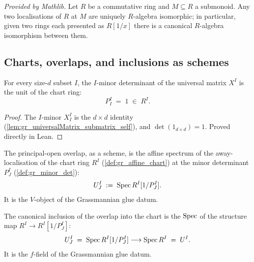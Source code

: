 \begin{lemma}
  \label{lem:mathlib_isLocalization_algEquiv}
  \mathlibok
  \textit{Provided by Mathlib.}
  Let \(R\) be a commutative ring and \(M \subseteq R\) a submonoid. Any two
  localisations of \(R\) at \(M\) are uniquely \(R\)-algebra isomorphic; in
  particular, given two rings each presented as \(R[1/x]\) there is a canonical
  \(R\)-algebra isomorphism between them.
\end{lemma}

\subsection*{Charts, overlaps, and inclusions as schemes}

\begin{theorem}\leanok
  \label{lem:gr_minorDet_self}
  For every size-\(d\) subset \(I\), the \(I\)-minor determinant of the universal
  matrix \(X^I\) is the unit of the chart ring:
  \[
    P^I_I \;=\; 1 \;\in\; R^I.
  \]
\end{theorem}
\begin{proof}
  \leanok
  The \(I\)-minor \(X^I_I\) is the \(d \times d\) identity
  (\cref{lem:gr_universalMatrix_submatrix_self}), and \(\det(1_{d\times d}) = 1\).
  Proved directly in Lean.
\end{proof}

\begin{definition}\leanok
  \label{def:gr_chart_overlap}
  The principal-open overlap, as a scheme, is the affine spectrum of the
  away-localisation of the chart ring \(R^I\) (\cref{def:gr_affine_chart}) at the
  minor determinant \(P^I_J\) (\cref{def:gr_minor_det}):
  \[
    U^I_J \;:=\; \operatorname{Spec} R^I[1/P^I_J].
  \]
  It is the \(V\)-object of the Grassmannian glue datum.
\end{definition}

\begin{definition}\leanok
  \label{def:gr_chart_incl}
  The canonical inclusion of the overlap into the chart is the \(\operatorname{Spec}\) of the
  structure map \(R^I \to R^I[1/P^I_J]\):
  \[
    U^I_J \;=\; \operatorname{Spec} R^I[1/P^I_J] \longrightarrow \operatorname{Spec} R^I \;=\; U^I .
  \]
  It is the \(f\)-field of the Grassmannian glue datum.
\end{definition}

